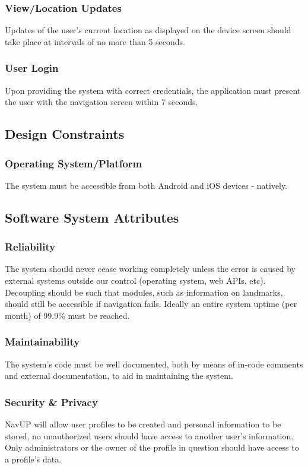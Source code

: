 \documentclass[12pt, a4paper]{article}
\begin{document}
		\subsubsection{View/Location Updates} Updates of the user's current location as displayed on the device screen should take place at intervals of no more than 5 seconds.
		\subsubsection{User Login} Upon providing the system with correct credentials, the application must present the user with the navigation screen within 7 seconds. 
	\subsection{Design Constraints}
		\subsubsection{Operating System/Platform} The system must be accessible from both Android and iOS devices - natively.		
	\subsection{Software System Attributes}
		\subsubsection{Reliability} The system should never cease working completely unless the error is caused by external systems outside our control (operating system, web APIs, etc). Decoupling should be such that modules, such as information on landmarks, should still be accessible if navigation fails. Ideally an entire system uptime (per month) of 99.9\% must be reached.
		\subsubsection{Maintainability} The system's code must be well documented, both by means of in-code comments and external documentation, to aid in maintaining the system.
		\subsubsection{Security \& Privacy} NavUP will allow user profiles to be created and personal information to be stored, no unauthorized users should have access to another user's information. Only administrators or the owner of the profile in question should have access to a profile's data.
\end{document}
